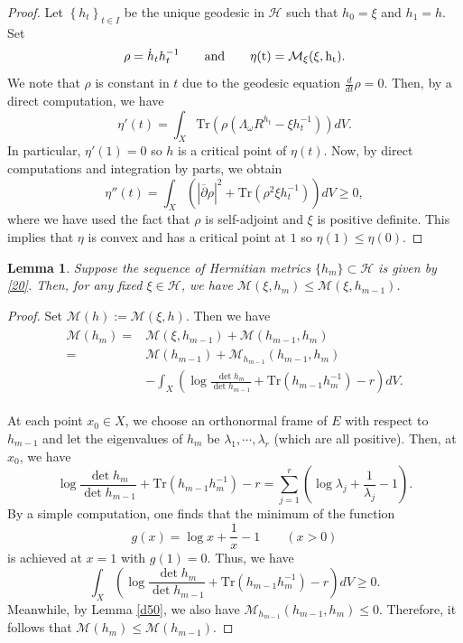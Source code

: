 \documentclass[11pt]{amsart}
\newtheorem{lemma}{Lemma}[section]
\numberwithin{equation}{section}
\theoremstyle{remark}
\renewcommand{\bar}{\overline}
\newcommand{\pa}{\partial}
\newcommand{\M}{{\mathcal M}}
\newcommand{\hh}{{\mathcal H}}
\newcommand{\lb}{\left (}
\newcommand{\rb}{\right )}
\newcommand{\lfb}{\left \{}
\newcommand{\rfb}{\right \}}
\newcommand{\tr}{\text{Tr}}
\begin{document}
\begin{proof}

Let $\lfb h_t\rfb_{t\in I}$ be the unique geodesic in $\hh$ such that $h_0=\xi$ and $h_1=h$. Set \[\rho=\dot h_t h_t^{-1} \qquad \rm{and} \qquad \eta(t)=\M_\xi(\xi,h_t).\] We note that $\rho$ is constant in $t$ due to the geodesic equation $\frac{d}{dt}\rho=0$. Then, by a direct computation, we have
\[
\eta'(t)=\int_X \tr \lb \rho \lb \Lambda_\omega R^{h_t}-\xi h_t^{-1}\rb \rb dV.
\]
In particular, $\eta'(1)=0$ so $h$ is a critical point of $\eta(t)$. Now, by direct computations and integration by parts, we obtain
\begin{equation}\label{55}
\eta''(t)=\int_X \lb |\bar\pa\rho|^2+\tr\lb \rho^2 \xi h_t^{-1}\rb\rb dV\geq 0,
\end{equation}
where we have used the fact that $\rho$ is self-adjoint and $\xi$ is positive definite. This implies that $\eta$ is convex and has a critical point at $1$ so $\eta(1)\leq \eta(0)$.

\end{proof}


\begin{lemma}\label{d60} Suppose the sequence of Hermitian metrics $\{h_m\}\subset \hh$ is given by \eqref{20}. Then,
for any fixed $\xi\in\hh$, we have $\M(\xi, h_m)\leq \M(\xi, h_{m-1})$.
\end{lemma}

\begin{proof}

Set $\M(h) :=\M(\xi,h)$. Then we have
\begin{align}\label{d70}
\begin{split}
\M(h_m) =  & \M(\xi,h_{m-1})+\M(h_{m-1},h_m)\\
= & \M(h_{m-1})+\M_{h_{m-1}}\lb h_{m-1},h_m\rb\\
& - \int_X\lb  \log \frac{\det h_m}{\det h_{m-1}}+\tr\lb h_{m-1}h_m^{-1}\rb -r\rb dV.
\end{split}
\end{align}

At each point $x_0\in X$, we choose an orthonormal frame of $E$ with respect to $h_{m-1}$ and let the eigenvalues of $h_m$ be $\lambda_1,\cdots,\lambda_r$ (which are all positive). Then, at $x_0$, we have
\[
\log \frac{\det h_m}{\det h_{m-1}}+\tr\lb h_{m-1}h_m^{-1}\rb -r=\sum_{j=1}^r \lb \log \lambda_j+\frac{1}{\lambda_j}-1\rb.
\]
By a simple computation, one finds that the minimum of the function
\[g(x)=\log x+\frac 1x-1 \qquad (x>0)\] is achieved at $x=1$ with $g(1)=0$. Thus, we have
\[
\int_X\lb  \log \frac{\det h_m}{\det h_{m-1}}+\tr\lb h_{m-1}h_m^{-1}\rb -r\rb dV\geq 0.
\]
Meanwhile,  by Lemma \ref{d50}, we also have $\M_{h_{m-1}}\lb h_{m-1},h_m\rb\leq 0$. Therefore, it follows that $\M(h_m)\leq \M(h_{m-1})$.

\end{proof}
\end{document}
